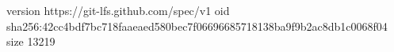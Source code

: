 version https://git-lfs.github.com/spec/v1
oid sha256:42cc4bdf7bc718faaeaed580bec7f06696685718138ba9f9b2ac8db1c0068f04
size 13219
